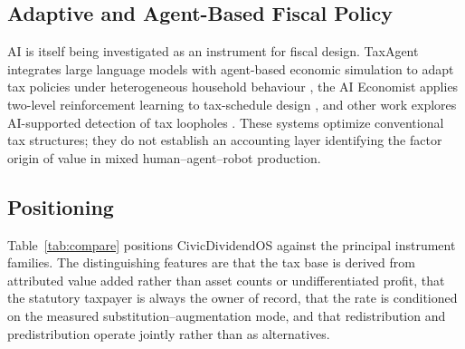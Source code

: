 \documentclass[journal]{IEEEtran}
\theoremstyle{plain}
\theoremstyle{definition}
\begin{document}
\subsection{Adaptive and Agent-Based Fiscal Policy}

AI is itself being investigated as an instrument for fiscal design. TaxAgent integrates large language models with agent-based economic simulation to adapt tax policies under heterogeneous household behaviour \cite{TaxAgent2025}, the AI Economist applies two-level reinforcement learning to tax-schedule design \cite{Zheng2022AIEconomist}, and other work explores AI-supported detection of tax loopholes \cite{Fratric2025}. These systems optimize conventional tax structures; they do not establish an accounting layer identifying the factor origin of value in mixed human--agent--robot production.

\subsection{Positioning}

Table~\ref{tab:compare} positions CivicDividendOS against the principal instrument families. The distinguishing features are that the tax base is derived from attributed value added rather than asset counts or undifferentiated profit, that the statutory taxpayer is always the owner of record, that the rate is conditioned on the measured substitution--augmentation mode, and that redistribution and predistribution operate jointly rather than as alternatives.
\end{document}
